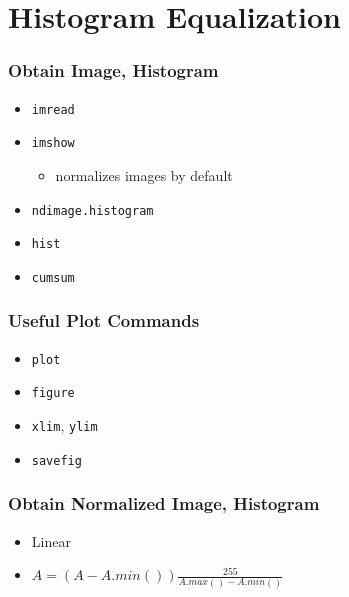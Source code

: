 \documentclass[presentation]{beamer}
\begin{document}
\section{Histogram Equalization}
\label{sec-4}
\begin{frame}
\frametitle{Obtain Image, Histogram}
\label{sec-4_1}

\begin{itemize}
\item \texttt{imread}
\item \texttt{imshow}

\begin{itemize}
\item normalizes images by default
\end{itemize}

\item \texttt{ndimage.histogram}
\item \texttt{hist}
\item \texttt{cumsum}
\end{itemize}
\end{frame}
\begin{frame}
\frametitle{Useful Plot Commands}
\label{sec-4_2}

\begin{itemize}
\item \texttt{plot}
\item \texttt{figure}
\item \texttt{xlim}, \texttt{ylim}
\item \texttt{savefig}
\end{itemize}
\end{frame}
\begin{frame}
\frametitle{Obtain Normalized Image, Histogram}
\label{sec-4_3}

\begin{itemize}
\item Linear
\item $A = (A-A.min())\frac{255}{A.max()-A.min()}$
\end{itemize}
\end{frame}
\end{document}
